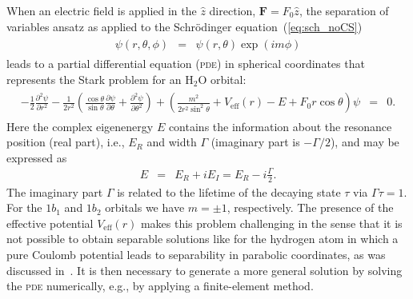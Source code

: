When an electric field is applied in the $\hat{z}$ direction,
$\mathbf{F} = F_{0}\hat{z}$, the separation of variables ansatz as
applied to the Schr\"{o}dinger equation~(\ref{eq:sch_noCS})
%
\begin{eqnarray}
  \begin{split}
    \psi(r,\theta,\phi) & = & \psi(r,\theta)\exp(im\phi)
  \end{split}
\label{eq:sov}
\end{eqnarray}
%
leads to a partial differential equation (\textsc{pde}) in spherical
coordinates that represents the Stark problem for an H$_{2}$O orbital:
%
\begin{eqnarray}
 \begin{split}
  -\frac{1}{2} \frac{\partial^{2}\psi}{\partial r^2} - \frac{1}{2r^2}
  (\frac{\cos\theta}{\sin\theta} \frac{\partial\psi}{\partial\theta} + 
  \frac{\partial^2\psi}{\partial\theta^2})
  + (\frac{m^2}{2r^2 \sin^2\theta} + V_{\mathrm{eff}}(r) - E +
  F_{0}r\cos\theta)\psi & = & 0.
  \end{split}
\label{eq:pde}
\end{eqnarray}
%
Here the complex eigenenergy $E$ contains the information about the
resonance position (real part), i.e., $E_{R}$ and width $\Gamma$
(imaginary part is $-\Gamma/2$), and may be expressed as
%
\begin{eqnarray}
E & = & E_{R} + iE_{I} = E_{R} - i\frac{\Gamma}{2}.
\label{eq:complex_E}
\end{eqnarray}
%
The imaginary part $\Gamma$ is related to the lifetime of the decaying
state $\tau$ via $\Gamma\tau = 1$. For the $1b_{1}$ and $1b_{2}$
orbitals we have $m=\pm 1$, respectively. The presence of the
effective potential $V_{\mathrm{eff}}(r)$ makes this problem
challenging in the sense that it is not possible to obtain separable
solutions like for the hydrogen atom in which a pure Coulomb potential
leads to separability in parabolic coordinates, as was discussed
in~\cite{Telnov_1989}. It is then necessary to generate a more general
solution by solving the \textsc{pde} numerically, e.g., by applying a
finite-element method.

